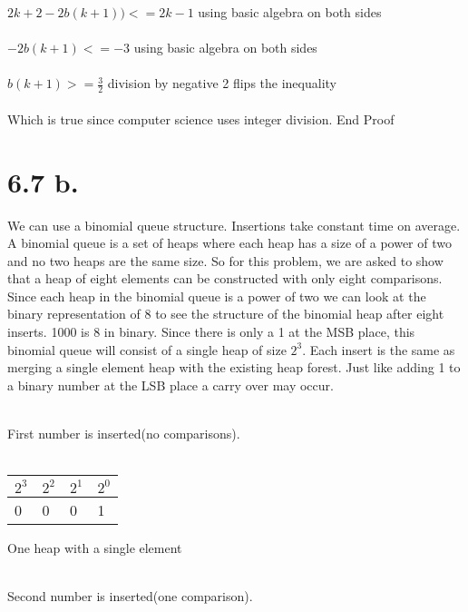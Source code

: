 \documentclass[12pt,letterpaper]{article}
\begin{document}
$2k+2 - 2b(k+1)) <= 2k - 1$ \hspace*{.5 in} using basic algebra on both sides\\\\
$-2b(k+1)<=-3$ \hspace*{.5 in} using basic algebra on both sides\\\\
$b(k+1)>=\frac{3}{2}$ \hspace*{.5 in} division by negative 2 flips the inequality\\\\
Which is true since computer science uses integer division. End Proof\\
\section*{6.7 b.}
We can use a binomial queue structure. Insertions take constant time on average. A binomial queue is a set of heaps where each heap has a size of a power of two and no two heaps are the same size. So for this problem, we are asked to show that a heap of eight elements can be constructed with only eight comparisons. Since each heap in the binomial queue is a power of two we can look at the binary representation of 8 to see the structure of the binomial heap after eight inserts. 1000 is 8 in binary. Since there is only a 1 at the MSB place, this binomial queue will consist of a single heap of size $2^3$. Each insert is the same as merging a single element heap with the existing heap forest. Just like adding 1 to a binary number at the LSB place a carry over may occur.\\\\
 First number is inserted(no comparisons).\\\\
\begin{tabular}{ |l|l|l|l| }
   \hline
   $2^3$  & $2^2$  & $2^1$  & $2^0$ \\ \hline
    0 & 0 & 0 & 1 \\
   \hline
 \end{tabular} One heap with a single element\\\\
 Second number is inserted(one comparison).\\\\
\end{document}
